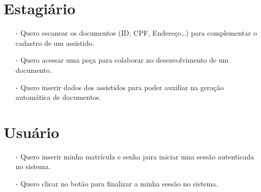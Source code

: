\documentclass[12pt,a4paper]{report}
\begin{document}
\section{Estagiário}
\begin{itemize}
\item[-] Quero escanear os documentos (ID, CPF, Endereço…) para complementar o cadastro de um assistido.
\item[-] Quero acessar uma peça para colaborar no desenvolvimento de um documento.
\item[-] Quero inserir dados dos assistidos para poder auxiliar na geração automática de documentos.
\end{itemize}

\section{Usuário}
\begin{itemize}
\item[-] Quero inserir minha matrícula e senha para iniciar uma sessão autenticada no sistema.
\item[-] Quero clicar no botão para finalizar a minha sessão no sistema.
\end{itemize}
\end{document}
